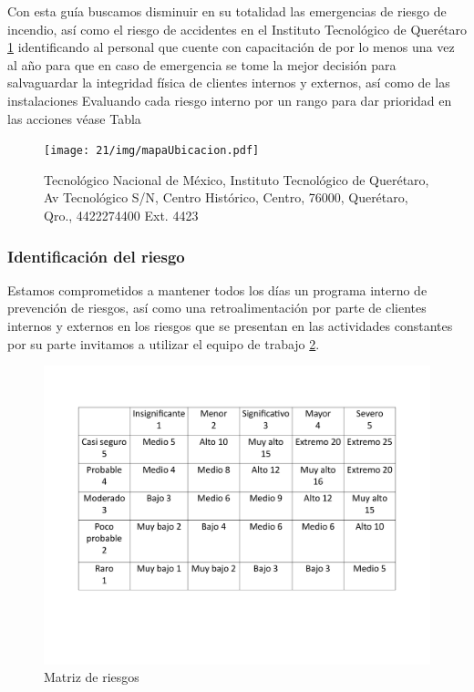     Con esta guía buscamos disminuir en su totalidad las emergencias de riesgo de incendio, así como el riesgo de accidentes en el Instituto Tecnológico de Querétaro \ref{fig:mapaUbicacion} identificando al personal que cuente con capacitación de por lo menos una vez al año para que en caso de emergencia se tome la mejor decisión para salvaguardar la integridad física de clientes internos y externos, así como de las instalaciones
    Evaluando cada riesgo interno por un rango para dar prioridad en las acciones véase Tabla %
    
    
    \begin{figure}[H]
        \centering
        \texttt{[image: 21/img/mapaUbicacion.pdf]}
        \caption{Tecnológico Nacional de México, Instituto Tecnológico de Querétaro, Av Tecnológico S/N, Centro Histórico, Centro, 76000, Querétaro, Qro., 4422274400 Ext. 4423}
        \label{fig:mapaUbicacion}
    \end{figure}
    
    \subsubsection{Identificación del riesgo}
    
    Estamos comprometidos a mantener todos los días un programa interno de prevención de riesgos, así como una retroalimentación por parte de clientes internos y externos en los riesgos que se presentan en las actividades constantes por su parte invitamos a utilizar el equipo de trabajo \ref{fig:matriz}.
    
    \begin{figure}[H]
        \centering
        \includegraphics[scale=0.28]{21/img/matriz.pdf}
        \caption{Matriz de riesgos}
        \label{fig:matriz}
    \end{figure}
    
